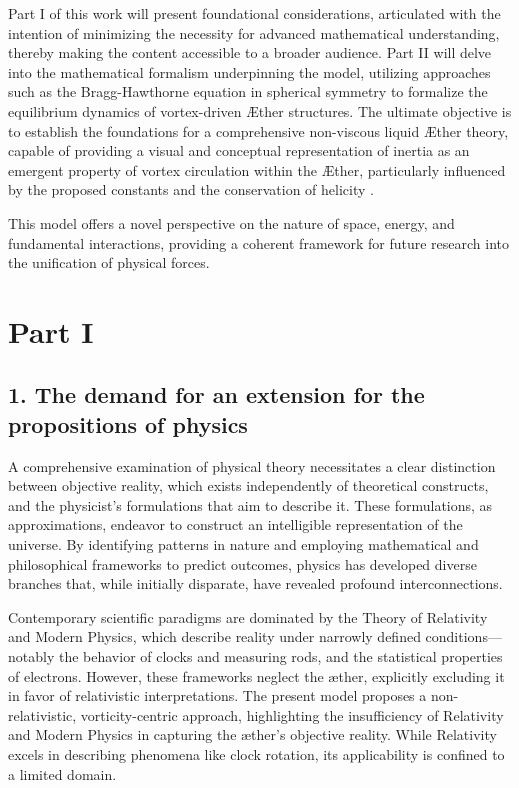 \documentclass[a4paper,10pt]{article}
\begin{document}
    Part I of this work will present foundational considerations, articulated with the intention of minimizing the necessity for advanced mathematical understanding, thereby making the content accessible to a broader audience. Part II will delve into the mathematical formalism underpinning the model, utilizing approaches such as the Bragg-Hawthorne equation in spherical symmetry \cite{keller2024} to formalize the equilibrium dynamics of vortex-driven Æther structures. The ultimate objective is to establish the foundations for a comprehensive non-viscous liquid Æther theory, capable of providing a visual and conceptual representation of inertia as an emergent property of vortex circulation within the Æther, particularly influenced by the proposed constants and the conservation of helicity \cite{kleckner2016}.





    This model offers a novel perspective on the nature of space, energy, and fundamental interactions, providing a coherent framework for future research into the unification of physical forces.





    \section{Part I}\label{sec:part-i}
    \subsection{1. The demand for an extension for the propositions of physics}\label{sec:introduction}

    A comprehensive examination of physical theory necessitates a clear distinction between objective reality, which exists independently of theoretical constructs, and the physicist's formulations that aim to describe it. These formulations, as approximations, endeavor to construct an intelligible representation of the universe. By identifying patterns in nature and employing mathematical and philosophical frameworks to predict outcomes, physics has developed diverse branches that, while initially disparate, have revealed profound interconnections.

    Contemporary scientific paradigms are dominated by the Theory of Relativity and Modern Physics, which describe reality under narrowly defined conditions—notably the behavior of clocks and measuring rods, and the statistical properties of electrons. However, these frameworks neglect the æther, explicitly excluding it in favor of relativistic interpretations. The present model proposes a non-relativistic, vorticity-centric approach, highlighting the insufficiency of Relativity and Modern Physics in capturing the æther’s objective reality. While Relativity excels in describing phenomena like clock rotation, its applicability is confined to a limited domain.
\end{document}
